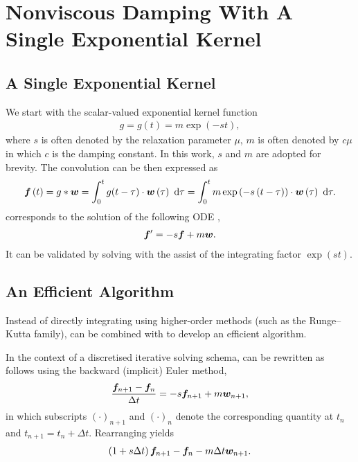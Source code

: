 \section{Nonviscous Damping With A Single Exponential Kernel}
\subsection{A Single Exponential Kernel}
We start with the scalar-valued exponential kernel function
\begin{gather}
g=g\left(t\right)=m\exp\left(-st\right),
\end{gather}
where $s$ is often denoted by the relaxation parameter $\mu$, $m$ is often denoted by $c\mu$ in which $c$ is the damping constant. In this work, $s$ and $m$ are adopted for brevity.
The convolution can be then expressed as
\begin{gather}\label{eq:single_conv}
\bm{f}\left(t\right)=g*\bm{w}=\int_0^tg(t-\tau)\cdot\bm{w}\left(\tau\right)~\mathrm{d}\tau=\int_0^tm\exp\left(-s\left(t-\tau\right)\right)\cdot\bm{w}\left(\tau\right)~\mathrm{d}\tau.
\end{gather}
 corresponds to the solution of the following ODE \citep[see, e.g.,][\S~80]{Zwillinger2021},
\begin{gather}\label{eq:single_conv_ode}
\bm{f}'=-s\bm{f}+m\bm{w}.
\end{gather}
It can be validated by solving  with the assist of the integrating factor $\exp\left(st\right)$.
\subsection{An Efficient Algorithm}
Instead of directly integrating  using higher-order methods (such as the Runge--Kutta family),  can be combined with  to develop an efficient algorithm.

In the context of a discretised iterative solving schema,  can be rewritten as follows using the backward (implicit) Euler method,
\begin{gather}\label{eq:discretised_a}
\dfrac{\bm{f}_{n+1}-\bm{f}_n}{\Delta{}t}=-s\bm{f}_{n+1}+m\bm{w}_{n+1},
\end{gather}
in which subscripts $\left(\cdot\right)_{n+1}$ and $\left(\cdot\right)_n$ denote the corresponding quantity at $t_n$ and $t_{n+1}=t_n+\Delta{}t$.
Rearranging  yields
\begin{gather}\label{eq:discretised_b}
\left(1+s\Delta{}t\right)\bm{f}_{n+1}-\bm{f}_n-m\Delta{}t\bm{w}_{n+1}.
\end{gather}

